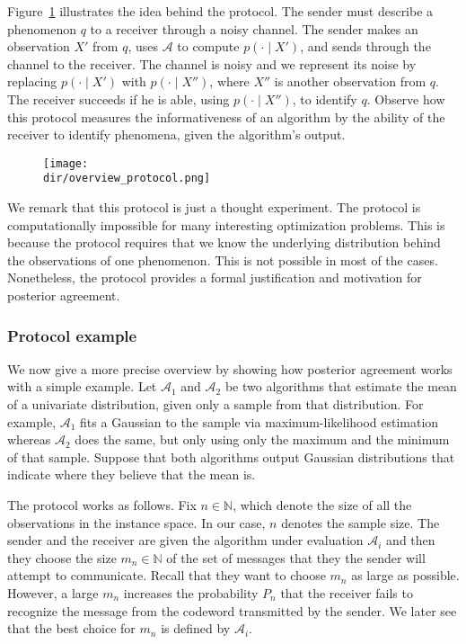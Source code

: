 Figure~\ref{fig:overview_protocol} illustrates the idea behind the protocol. The sender must describe a phenomenon $q$ to a receiver through a noisy channel. The sender makes an observation $X'$ from $q$, uses $\mathcal{A}$ to compute $p(\cdot \mid X')$, and sends through the channel to the receiver. The channel is noisy and we represent its noise by replacing $p(\cdot \mid X')$ with $p(\cdot \mid X'')$, where $X''$ is another observation from $q$. The receiver succeeds if he is able, using $p(\cdot \mid X'')$, to identify $q$. Observe how this protocol measures the informativeness of an algorithm by the ability of the receiver to identify phenomena, given the algorithm's output.

\begin{figure}
\texttt{[image: \\dir/overview\_protocol.png]}
\caption{}
\label{fig:overview_protocol}
\end{figure}

We remark that this protocol is just a thought experiment. The protocol is computationally impossible for many interesting optimization problems. This is because the protocol requires that we know the underlying distribution behind the observations of one phenomenon. This is not possible in most of the cases. Nonetheless, the protocol provides a formal justification and motivation for posterior agreement.

\subsubsection*{Protocol example}

We now give a more precise overview by showing how posterior agreement works with a simple example. Let $\mathcal{A}_1$ and $\mathcal{A}_2$ be two algorithms that estimate the mean of a univariate distribution, given only a sample from that distribution. For example, $\mathcal{A}_1$ fits a Gaussian to the sample via maximum-likelihood estimation whereas $\mathcal{A}_2$ does the same, but only using only the maximum and the minimum of that sample. Suppose that both algorithms output Gaussian distributions that indicate where they believe that the mean is. 

The protocol works as follows. Fix $n \in \mathbb{N}$, which denote the size of all the observations in the instance space. In our case, $n$ denotes the sample size. The sender and the receiver are given the algorithm under evaluation $\mathcal{A}_i$ and then they choose the size $m_n \in \mathbb{N}$ of the set of messages that they the sender will attempt to communicate. Recall that they want to choose $m_n$ as large as possible. However, a large $m_n$ increases the probability $P_n$ that the receiver fails to recognize the message from the codeword transmitted by the sender. We later see that the best choice for $m_n$ is defined by $\mathcal{A}_i$. 

